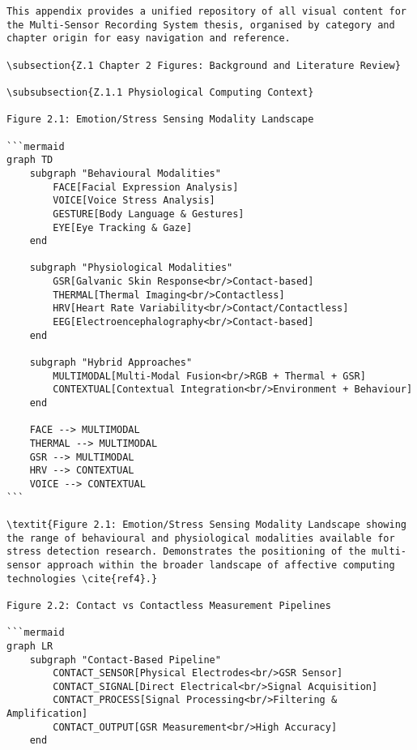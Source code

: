 \begin{verbatim}
This appendix provides a unified repository of all visual content for the Multi-Sensor Recording System thesis, organised by category and chapter origin for easy navigation and reference.

\subsection{Z.1 Chapter 2 Figures: Background and Literature Review}

\subsubsection{Z.1.1 Physiological Computing Context}

Figure 2.1: Emotion/Stress Sensing Modality Landscape

```mermaid
graph TD
    subgraph "Behavioural Modalities"
        FACE[Facial Expression Analysis]
        VOICE[Voice Stress Analysis]
        GESTURE[Body Language & Gestures]
        EYE[Eye Tracking & Gaze]
    end

    subgraph "Physiological Modalities"
        GSR[Galvanic Skin Response<br/>Contact-based]
        THERMAL[Thermal Imaging<br/>Contactless]
        HRV[Heart Rate Variability<br/>Contact/Contactless]
        EEG[Electroencephalography<br/>Contact-based]
    end

    subgraph "Hybrid Approaches"
        MULTIMODAL[Multi-Modal Fusion<br/>RGB + Thermal + GSR]
        CONTEXTUAL[Contextual Integration<br/>Environment + Behaviour]
    end

    FACE --> MULTIMODAL
    THERMAL --> MULTIMODAL
    GSR --> MULTIMODAL
    HRV --> CONTEXTUAL
    VOICE --> CONTEXTUAL
```

\textit{Figure 2.1: Emotion/Stress Sensing Modality Landscape showing the range of behavioural and physiological modalities available for stress detection research. Demonstrates the positioning of the multi-sensor approach within the broader landscape of affective computing technologies \cite{ref4}.}

Figure 2.2: Contact vs Contactless Measurement Pipelines

```mermaid
graph LR
    subgraph "Contact-Based Pipeline"
        CONTACT_SENSOR[Physical Electrodes<br/>GSR Sensor]
        CONTACT_SIGNAL[Direct Electrical<br/>Signal Acquisition]
        CONTACT_PROCESS[Signal Processing<br/>Filtering & Amplification]
        CONTACT_OUTPUT[GSR Measurement<br/>High Accuracy]
    end


\end{verbatim}
